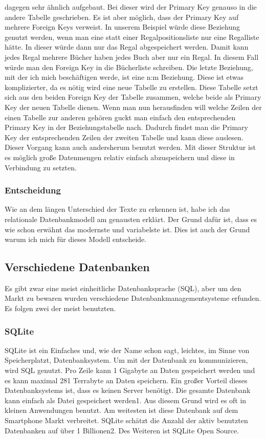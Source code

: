 \documentclass[a4paper, 12pt]{article}
\theoremstyle{plain}
\theoremstyle{definition}
\begin{document}
dagegen sehr ähnlich aufgebaut. Bei dieser wird der Primary Key genauso in die andere Tabelle geschrieben. Es ist aber möglich, dass der Primary Key auf mehrere Foreign Keys verweist. In unserem Beispiel würde diese Beziehung genutzt werden, wenn man eine statt einer Regalpositionsliste nur eine Regalliste hätte. In dieser würde dann nur das Regal abgespeichert werden. Damit kann jedes Regal mehrere Bücher haben jedes Buch aber nur ein Regal. In diesem Fall würde man den Foreign Key in die Bücherliste schreiben. Die letzte Beziehung, mit der ich mich beschäftigen werde, ist eine n:m Beziehung. Diese ist etwas komplizierter, da es nötig wird eine neue Tabelle zu erstellen. Diese Tabelle setzt sich aus den beiden Foreign Key der Tabelle zusammen, welche beide als Primary Key der neuen Tabelle dienen. Wenn man nun herausfinden will welche Zeilen der einen Tabelle zur anderen gehören guckt man einfach den entsprechenden Primary Key in der Beziehungstabelle nach. Dadurch findet man die Primary Key der entsprechenden Zeilen der zweiten Tabelle und kann diese auslesen. Dieser Vorgang kann auch andersherum benutzt werden. Mit dieser Struktur ist es möglich große Datenmengen relativ einfach abzuspeichern und diese in Verbindung zu setzten.

	\subsubsection{Entscheidung}
	Wie an dem längen Unterschied der Texte zu erkennen ist, habe ich das relationale Datenbankmodell am genausten erklärt. Der Grund dafür ist, dass es wie schon erwähnt das modernste und variabelste ist. Dies ist auch der Grund warum ich mich für dieses Modell entscheide.
	
	\subsection{Verschiedene Datenbanken}
	\label{sec:dbArten}
	
	Es gibt zwar eine meist einheitliche Datenbanksprache (SQL), aber um den Markt zu bewaren wurden verschiedene Datenbankmanagementsysteme erfunden. Es folgen zwei der meist benutzten.
	
	\subsubsection{SQLite}
	\label{sec:SQLite}
	SQLite ist ein Einfaches und, wie der Name schon sagt, leichtes, im Sinne von Speicherplatzt, Datenbanksystem. Um mit der Datenbank zu kommunizieren, wird SQL genutzt. Pro Zeile kann 1 Gigabyte an Daten gespeichert werden und es kann maximal 281 Terrabyte an Daten speichern. Ein großer Vorteil dieses Datenbanksystems ist, dass es keinen Server benötigt. Die gesamte Datenbank kann einfach als Datei gespeichert werden1. Aus diesem Grund wird es oft in kleinen Anwendungen benutzt. Am weitesten ist diese Datenbank auf dem Smartphone Markt verbreitet. SQLite schätzt die Anzahl der aktiv benutzten Datenbanken auf über 1 Billionen2. Des Weiteren ist SQLite Open Source.
	
\end{document}
